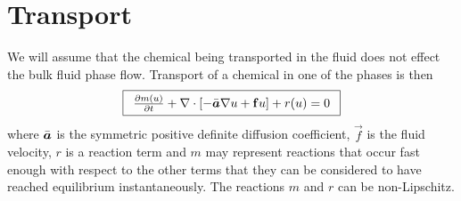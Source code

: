 \documentclass[12pt,dvips,letterpaper]{article}
\begin{document}
\section{Transport}
We will assume that the chemical being transported in the
fluid does not effect the bulk fluid phase flow.  Transport of a
chemical in one of the phases is then
\begin{equation}
\fbox{$ \begin{array}{rcl} 
\frac{\partial {m(u)}}{\partial {t}} + \nabla \cdot [- \bar{\mbox{{\boldmath ${a}$}}} \nabla u + {\bf f} u ]  +  r(u) = 0
 \end{array} $}
\end{equation}
where $\bar{\mbox{{\boldmath ${a}$}}}$ is the symmetric positive definite diffusion coefficient, $\vec{f}$ is the fluid
velocity, $r$ is a reaction term and $m$ may represent reactions that
occur fast enough with respect to the other terms that they can be
considered to have reached equilibrium instantaneously. The reactions $m$ and $r$ can be non-Lipschitz. 
\end{document}
